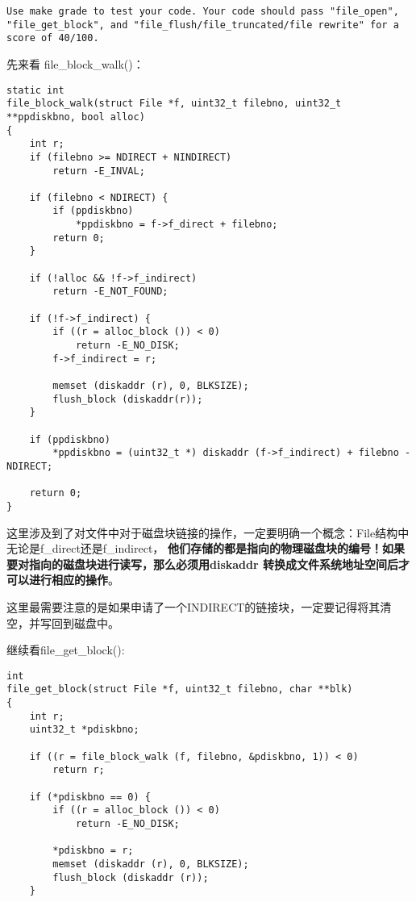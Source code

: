 \documentclass{article}
\newcommand{\highlight}[1]{{\bfseries \color{red}  #1}}
\newcommand{\funcname}[1]{{\ttfamily \small #1}}
\begin{document}
\begin{CJK*}{UTF8}{gkai}
\begin{lstlisting}[style=exercise]
Use make grade to test your code. Your code should pass "file_open", "file_get_block", and "file_flush/file_truncated/file rewrite" for a score of 40/100.
\end{lstlisting}


先来看 \funcname{file\_block\_walk()}：

\begin{lstlisting}[style=ccode, title={\scriptsize \ttfamily \bfseries fs/fs.c: file\_block\_walk()}]
static int
file_block_walk(struct File *f, uint32_t filebno, uint32_t **ppdiskbno, bool alloc)
{
    int r;
    if (filebno >= NDIRECT + NINDIRECT)
        return -E_INVAL;

    if (filebno < NDIRECT) {
        if (ppdiskbno)
            *ppdiskbno = f->f_direct + filebno; 
        return 0;
    }

    if (!alloc && !f->f_indirect)
        return -E_NOT_FOUND;

    if (!f->f_indirect) {
        if ((r = alloc_block ()) < 0)
            return -E_NO_DISK;
        f->f_indirect = r;

        memset (diskaddr (r), 0, BLKSIZE);
        flush_block (diskaddr(r));
    }

    if (ppdiskbno)
        *ppdiskbno = (uint32_t *) diskaddr (f->f_indirect) + filebno - NDIRECT;

    return 0;
}
\end{lstlisting}

这里涉及到了对文件中对于磁盘块链接的操作，一定要明确一个概念：File结构中无论是f\_direct还是f\_indirect，\highlight{他们存储的都是指向的物理磁盘块的编号！如果要对指向的磁盘块进行读写，那么必须用diskaddr 转换成文件系统地址空间后才可以进行相应的操作}。

这里最需要注意的是如果申请了一个INDIRECT的链接块，一定要记得将其清空，并写回到磁盘中。

继续看\funcname{file\_get\_block()}:

\begin{lstlisting}[style=ccode, title={\scriptsize \ttfamily \bfseries fs/fs.c: file\_get\_block()}]
int
file_get_block(struct File *f, uint32_t filebno, char **blk)
{
    int r;
    uint32_t *pdiskbno;

    if ((r = file_block_walk (f, filebno, &pdiskbno, 1)) < 0)
        return r;

    if (*pdiskbno == 0) {
        if ((r = alloc_block ()) < 0)
            return -E_NO_DISK;

        *pdiskbno = r;
        memset (diskaddr (r), 0, BLKSIZE);
        flush_block (diskaddr (r));
    }


\end{lstlisting}
\end{CJK*}
\end{document}
